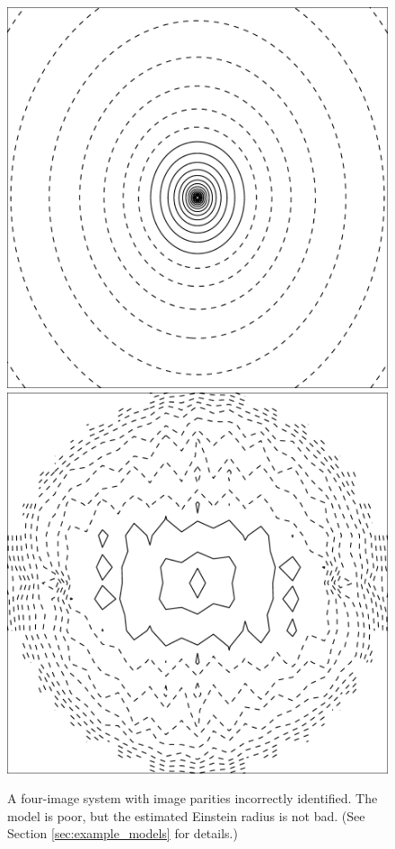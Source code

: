 \documentclass[usenatbib]{mn2e}
\newlength{\myplotswidth}
\begin{document}
\begin{figure}
  \includegraphics[width=\myplotswidth]{fig/ASW0000h2m_007025_kappa}
  \includegraphics[width=\myplotswidth]{fig/007025_mass}
  \caption[result 7025 (ASW0000h2m)]{A four-image system with image
    parities incorrectly identified.  The model is poor, but the
    estimated Einstein radius is not bad. (See Section
    \ref{sec:example_models} for details.)}
  \label{fig:7025}
\end{figure}
\end{document}
